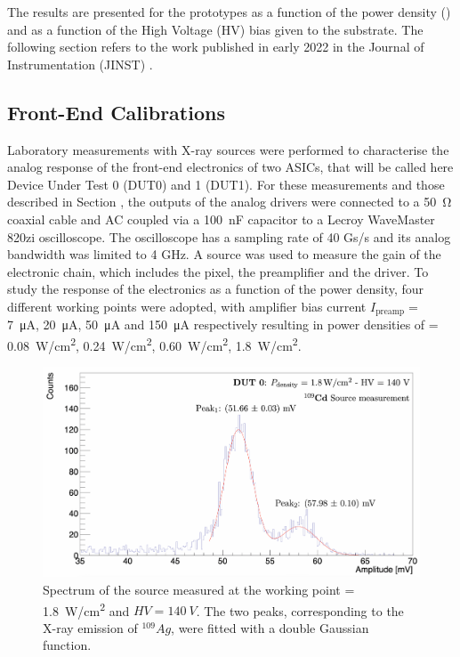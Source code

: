 		The results are presented for the prototypes as a function of the power density (\power) and as a function of the High Voltage (HV) bias  given to the substrate. The following section refers to the work published in early 2022 in the Journal of Instrumentation (JINST) \cite{ATTRACT_proto1_testbeam}. 
		
		\subsection{Front-End Calibrations}

		Laboratory measurements with X-ray sources were performed to characterise the analog response of the front-end electronics of two ASICs, that will be called here Device Under Test 0 (DUT0) and 1 (DUT1). For these measurements and those described in Section , the outputs of the analog drivers were connected to a \SI{50}{\ohm} coaxial cable and AC coupled via a \SI{100}{\nano\farad} capacitor to a Lecroy WaveMaster 820zi oscilloscope. The oscilloscope has a sampling rate of 40 Gs/s and its analog bandwidth was limited to 4 GHz. 
		A \Cd source was used to measure the gain of the electronic chain, which includes the pixel, the preamplifier and the driver. To study the response of the electronics as a function of the power density, four different working points were adopted, with  amplifier bias current $I_{\text{preamp}} = $  \SI{7}{\micro\ampere}, \SI{20}{\micro\ampere}, \SI{50}{\micro\ampere} and \SI{150}{\micro\ampere} respectively resulting in power densities of \power = \SI{0.08}{\watt/\centi\meter^2}, \SI{0.24}{\watt/\centi\meter^2}, \SI{0.60}{\watt/\centi\meter^2}, \SI{1.8}{\watt/\centi\meter^2}.
		\begin{figure}[h]
			\centering
			\includegraphics[width=0.88\linewidth]{files/ATTRACT_paper/Cd109_SpectrumAnalysis}
			\caption{Spectrum of the \Cd source measured at the working point \power = \SI{1.8}{\watt/\centi\meter^2} and $HV=140~V$. The two peaks, corresponding to the X-ray emission of $^{109}Ag$,  were fitted with a double Gaussian function.}
			\label{im:ATTRACT_CdSpectrum}
		\end{figure}
		
